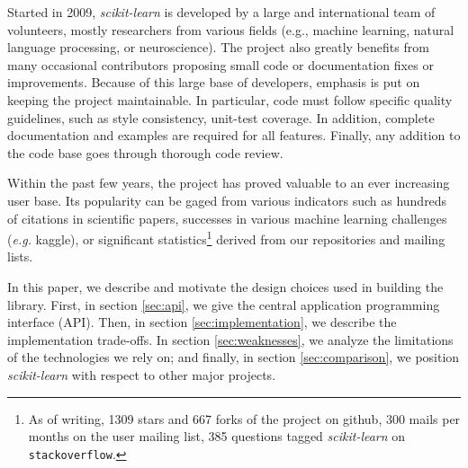 \documentclass{llncs}
\begin{document}
Started in 2009, \textit{scikit-learn} is developed by a large and
international team of volunteers, mostly researchers from
various fields (e.g., machine learning, natural language processing, or
neuroscience). The project also greatly benefits from many occasional
contributors proposing small code or documentation fixes or improvements.
Because of this large base of developers, emphasis is put on keeping
the project maintainable. In particular, code must follow specific
quality guidelines, such as style consistency, unit-test coverage. In
addition, complete documentation and examples are required for all
features. Finally, any addition to the code base goes through thorough
code review.

Within the past few years, the project has proved valuable to an ever
increasing user base. Its popularity can be gaged from various indicators
such as hundreds of citations in scientific papers, successes in various
machine learning challenges (\emph{e.g.} kaggle), or significant
statistics\footnote{As of writing, 1309 stars and 667 forks of the
project on github, 300 mails per months on the user mailing list, 385
questions tagged \emph{scikit-learn} on {\tt stackoverflow}.} derived from
our repositories and mailing lists.

In this paper, we describe and motivate the design choices used in
building the library. First, in section \ref{sec:api}, we give the
central application programming interface (API). Then, in section
\ref{sec:implementation}, we describe the implementation trade-offs.
In section \ref{sec:weaknesses}, we analyze the limitations of the
technologies we rely on; and finally, in section \ref{sec:comparison}, we
position \emph{scikit-learn} with respect to other major projects.


\end{document}
